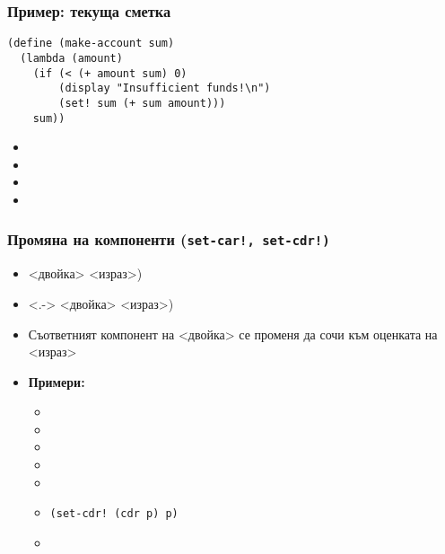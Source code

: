 \documentclass{beamer}
\begin{document}
\begin{frame}[fragile]
  \frametitle{Пример: текуща сметка}

\begin{lstlisting}
(define (make-account sum)
  (lambda (amount)
    (if (< (+ amount sum) 0)
        (display "Insufficient funds!\n")
        (set! sum (+ sum amount)))
    sum))
\end{lstlisting}
  \onslide<+->
  \begin{itemize}[<+->]
  \item {}
  \item {}
  \item {}
  \item {}
  \end{itemize}
\end{frame}

\begin{frame}
  \frametitle{Промяна на компоненти (\tt{set-car!}, \tt{set-cdr!})}

  \begin{itemize}[<+->]
  \item {} <двойка> <израз>\tta)
  \item<.->  <двойка> <израз>\tta)
  \item Съответният компонент на <двойка> се променя да сочи към оценката на <израз>
  \item \textbf{Примери:}
    \begin{itemize}
    \item {}
    \item {}
    \item {}
    \item {}
    \item {}
    \item \tt{(set-cdr! (cdr p) p)}
    \item {}
    \end{itemize}
  \end{itemize}
\end{frame}
\end{document}
